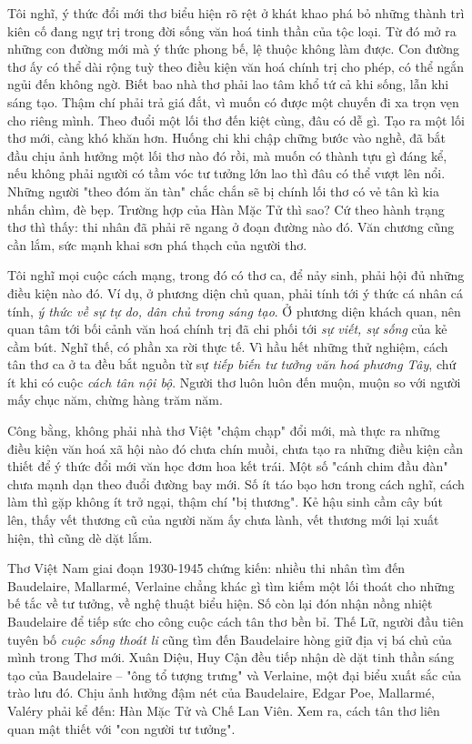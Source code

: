 \documentclass[../main.tex]{subfiles}
\begin{document}
\begin{multicols}{2}
Tôi nghĩ, ý thức đổi mới thơ biểu hiện rõ rệt ở khát khao phá bỏ những thành trì kiên cố đang ngự trị trong đời sống văn hoá tinh thần của tộc loại. Từ đó mở ra những con đường mới mà ý thức phong bế, lệ thuộc không làm được. Con đường thơ ấy có thể dài rộng tuỳ theo điều kiện văn hoá chính trị cho phép, có thể ngắn ngủi đến không ngờ. Biết bao nhà thơ phải lao tâm khổ tứ cả khi sống, lẫn khi sáng tạo. Thậm chí phải trả giá đắt, vì muốn có được một chuyến đi xa trọn vẹn cho riêng mình. Theo đuổi một lối thơ đến kiệt cùng, đâu có dễ gì. Tạo ra một lối thơ mới, càng khó khăn hơn. Huống chi khi chập chững bước vào nghề, đã bắt đầu chịu ảnh hưởng một lối thơ nào đó rồi, mà muốn có thành tựu gì đáng kể, nếu không phải người có tầm vóc tư tưởng lớn lao thì đâu có thể vượt lên nổi. Những người "theo đóm ăn tàn" chắc chắn sẽ bị chính lối thơ có vẻ tân kì kia nhấn chìm, đè bẹp. Trường hợp của Hàn Mặc Tử thì sao? Cứ theo hành trạng thơ thì thấy: thi nhân đã phải rẽ ngang ở đoạn đường nào đó. Văn chương cũng cần lắm, sức mạnh khai sơn phá thạch của người thơ. 
 
Tôi nghĩ mọi cuộc cách mạng, trong đó có thơ ca, để nảy sinh, phải hội đủ những điều kiện nào đó. Ví dụ, ở phương diện chủ quan, phải tính tới ý thức cá nhân cá tính, \textit{ý thức về sự tự do, dân chủ trong sáng tạo}. Ở phương diện khách quan, nên quan tâm tới bối cảnh văn hoá chính trị đã chi phối tới \textit{sự viết, sự sống} của kẻ cầm bút. Nghĩ thế, có phần xa rời thực tế. Vì hầu hết những thử nghiệm, cách tân thơ ca ở ta đều bắt nguồn từ sự \textit{tiếp biến tư tưởng văn hoá phương Tây}, chứ ít khi có cuộc \textit{cách tân nội bộ}. Người thơ luôn luôn đến muộn, muộn so với người mấy chục năm, chừng hàng trăm năm. 
 
Công bằng, không phải nhà thơ Việt "chậm chạp" đổi mới, mà thực ra những điều kiện văn hoá xã hội nào đó chưa chín muồi, chưa tạo ra những điều kiện cần thiết để ý thức đổi mới văn học đơm hoa kết trái. Một số "cánh chim đầu đàn" chưa mạnh dạn theo đuổi đường bay mới. Số ít táo bạo hơn trong cách nghĩ, cách làm thì gặp không ít trở ngại, thậm chí "bị thương". Kẻ hậu sinh cầm cây bút lên, thấy vết thương cũ của người năm ấy chưa lành, vết thương mới lại xuất hiện, thì cũng dè dặt lắm. 
 
Thơ Việt Nam giai đoạn 1930-1945 chứng kiến: nhiều thi nhân tìm đến Baudelaire, Mallarmé, Verlaine chẳng khác gì tìm kiếm một lối thoát cho những bế tắc về tư tưởng, về nghệ thuật biểu hiện. Số còn lại đón nhận nồng nhiệt Baudelaire để tiếp sức cho công cuộc cách tân thơ bền bỉ. Thế Lữ, người đầu tiên tuyên bố \textit{cuộc sống thoát li} cũng tìm đến Baudelaire hòng giữ địa vị bá chủ của mình trong Thơ mới. Xuân Diệu, Huy Cận đều tiếp nhận dè dặt tinh thần sáng tạo của Baudelaire – "ông tổ tượng trưng" và Verlaine, một đại biểu xuất sắc của trào lưu đó. Chịu ảnh hưởng đậm nét của Baudelaire, Edgar Poe, Mallarmé, Valéry phải kể đến: Hàn Mặc Tử và Chế Lan Viên. Xem ra, cách tân thơ liên quan mật thiết với "con người tư tưởng". 
 

\end{multicols}
\end{document}
